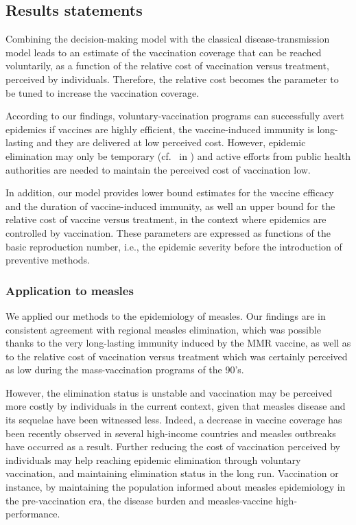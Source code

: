 \subsection{Results statements}
\label{Vaccine:Results}

Combining the decision-making model with the classical disease-transmission model leads to an estimate of the vaccination coverage that can be reached voluntarily, as a function of the relative cost of vaccination versus treatment, perceived by individuals. Therefore, the relative cost becomes the parameter to be tuned to increase the vaccination coverage.

According to our findings, voluntary-vaccination programs can successfully avert epidemics if vaccines are highly efficient, the vaccine-induced immunity is long-lasting and they are delivered at low perceived cost. However, epidemic elimination may only be temporary (cf.~ in ) and active efforts from public health authorities are needed to maintain the perceived cost of vaccination low. 

In addition, our model provides lower bound estimates for the vaccine efficacy and the duration of vaccine-induced immunity, as well an upper bound for the relative cost of vaccine versus treatment, in the context where epidemics are controlled by vaccination. These parameters are expressed as functions of the basic reproduction number, i.e., the epidemic severity before the introduction of preventive methods. 




\subsubsection{Application to measles}
We applied our methods to the epidemiology of measles. Our findings are in consistent agreement with regional measles elimination, which was possible thanks to the very long-lasting immunity induced by the MMR vaccine, as well as to the relative cost of vaccination versus treatment which was certainly perceived as low during the mass-vaccination programs of the 90's. 

However, the elimination status is unstable and vaccination may be perceived more costly by individuals in the current context, given that measles disease and its sequelae have been witnessed less. Indeed, a decrease in vaccine coverage has been recently observed in several high-income countries and measles outbreaks have occurred as a result. Further reducing the cost of vaccination perceived by individuals may help reaching epidemic elimination through voluntary vaccination, and maintaining elimination status in the long run. Vaccination or instance, by maintaining the population informed about measles epidemiology in the pre-vaccination era, the disease burden and measles-vaccine high-performance.

